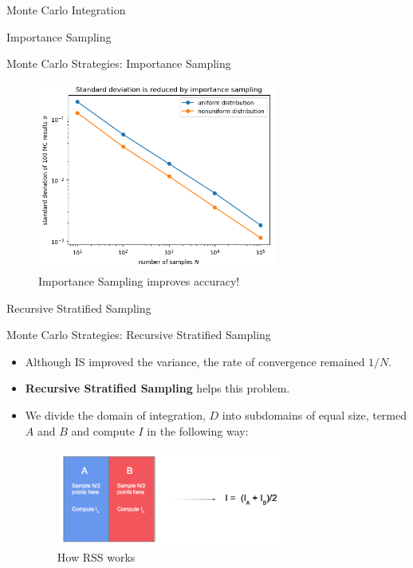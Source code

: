 \documentclass{beamer}
\begin{document}
\begin{section}{Monte Carlo Integration}
\begin{subsection}{Importance Sampling}
\begin{frame}{Monte Carlo Strategies: Importance Sampling}
    \begin{figure}
        \centering
        \includegraphics[width=0.7\textwidth]{output_16_0.png}
        \caption{Importance Sampling improves accuracy!}
        \label{fig:IS vs SMC}
    \end{figure}
\end{frame}
\end{subsection}

\begin{subsection}{Recursive Stratified Sampling}
\begin{frame}{Monte Carlo Strategies: Recursive Stratified Sampling}
    \begin{itemize}
    \item Although IS improved the variance, the rate of convergence remained $1/N$. 
    \pause
    \item \textbf{Recursive Stratified Sampling} helps this problem. 
    \pause
    \item We divide the domain of integration, $D$ into subdomains of equal size, termed $A$ and $B$ and compute $I$ in the following way:
    \pause
    \begin{figure}
        \centering
        \includegraphics[width=0.7\textwidth]{RSS.png}
        \caption{How RSS works}
        \label{fig:HowRSSworks}
    \end{figure}
    \end{itemize}
    \end{frame}
    

\end{subsection}
\end{section}
\end{document}
